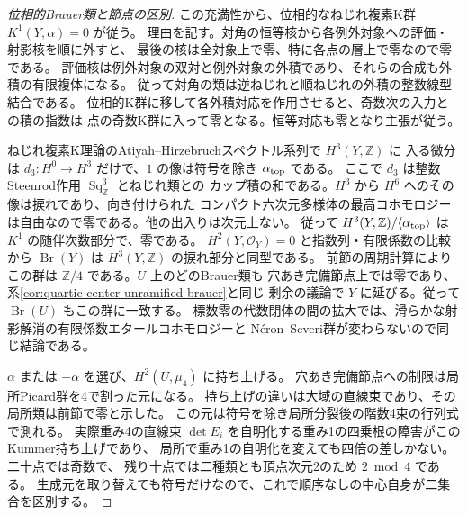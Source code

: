 \begin{proof}[位相的Brauer類と節点の区別]
この充満性から、位相的なねじれ複素K群 $K^1(Y,\alpha)=0$ が従う。
理由を記す。対角の恒等核から各例外対象への評価・射影核を順に外すと、
最後の核は全対象上で零、特に各点の層上で零なので零である。
評価核は例外対象の双対と例外対象の外積であり、それらの合成も外積の有限複体になる。
従って対角の類は逆ねじれと順ねじれの外積の整数線型結合である。
位相的K群に移して各外積対応を作用させると、奇数次の入力との積の指数は
点の奇数K群に入って零となる。恒等対応も零となり主張が従う。

ねじれ複素K理論のAtiyah--Hirzebruchスペクトル系列で $H^3(Y,\mathbb Z)$ に
入る微分は $d_3:H^0\to H^3$ だけで、$1$ の像は符号を除き $\alpha_{\rm top}$ である。
ここで $d_3$ は整数Steenrod作用 $\operatorname{Sq}^3_{\mathbb Z}$ とねじれ類との
カップ積の和である。$H^3$ から $H^6$ へのその像は捩れであり、向き付けられた
コンパクト六次元多様体の最高コホモロジーは自由なので零である。他の出入りは次元上ない。
従って $H^3(Y,\mathbb Z)/\langle\alpha_{\rm top}\rangle$ は $K^1$ の随伴次数部分で、零である。
$H^2(Y,\mathcal O_Y)=0$ と指数列・有限係数の比較から
$\operatorname{Br}(Y)$ は $H^3(Y,\mathbb Z)$ の捩れ部分と同型である。
前節の周期計算によりこの群は $\mathbb Z/4$ である。$U$ 上のどのBrauer類も
穴あき完備節点上では零であり、系\ref{cor:quartic-center-unramified-brauer}と同じ
剰余の議論で $Y$ に延びる。従って $\operatorname{Br}(U)$ もこの群に一致する。
標数零の代数閉体の間の拡大では、滑らかな射影解消の有限係数エタールコホモロジーと
N\'eron--Severi群が変わらないので同じ結論である。

$\alpha$ または $-\alpha$ を選び、$H^2(U,\mu_4)$ に持ち上げる。
穴あき完備節点への制限は局所Picard群を4で割った元になる。
持ち上げの違いは大域の直線束であり、その局所類は前節で零と示した。
この元は符号を除き局所分裂後の階数4束の行列式で測れる。
実際重み4の直線束 $\det E_i$ を自明化する重み1の四乗根の障害がこのKummer持ち上げであり、
局所で重み1の自明化を変えても四倍の差しかない。二十点では奇数で、
残り十点では二種類とも頂点次元2のため $2\bmod4$ である。
生成元を取り替えても符号だけなので、これで順序なしの中心自身が二集合を区別する。
\end{proof}

